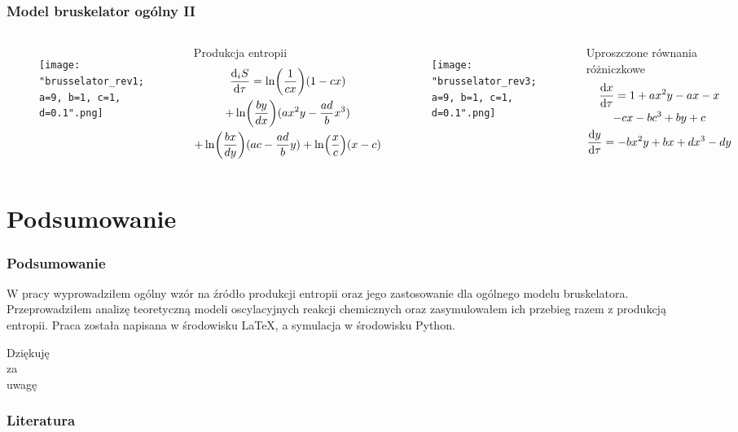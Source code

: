 \documentclass{beamer}
\begin{document}
\begin{frame}
\frametitle{Model bruskelator ogólny II}
\begin{columns}
\begin{figure}
\texttt{[image: "brusselator\_rev1; a=9, b=1, c=1, d=0.1".png]}
\end{figure}
\begin{block}{Produkcja entropii}
\vspace*{-\baselineskip}\setlength\belowdisplayshortskip{0pt}
\footnotesize
\begin{gather*}
	\dv{_{i}S}{\tau} = \ln(\frac{1}{cx})(1 - cx) \\
	+ \ln(\frac{by}{dx})(ax^{2}y - \frac{ad}{b}x^{3}) \\
	+ \ln(\frac{bx}{dy})(ac - \frac{ad}{b}y) + \ln(\frac{x}{c})(x - c)
\end{gather*}
\normalsize
\end{block}
\begin{figure}
\texttt{[image: "brusselator\_rev3; a=9, b=1, c=1, d=0.1".png]}
\end{figure}
\begin{block}{Uproszczone równania różniczkowe}
\vspace*{-\baselineskip}\setlength\belowdisplayshortskip{0pt}
\small
\begin{gather*}
	\dv{x}{\tau} = 1 + ax^{2}y - ax - x \\
	- cx - bc^{3} + by + c \\
	\dv{y}{\tau} = -bx^{2}y + bx + dx^{3} - dy
\end{gather*}
\normalsize
\end{block}
\end{columns}
\end{frame}

\section{Podsumowanie}

\begin{frame}
\frametitle{Podsumowanie}
W pracy wyprowadziłem ogólny wzór na źródło produkcji entropii oraz jego zastosowanie dla ogólnego modelu bruskelatora. Przeprowadziłem analizę teoretyczną modeli oscylacyjnych reakcji chemicznych oraz zasymulowałem ich przebieg razem z produkcją entropii. Praca została napisana w środowisku \LaTeX, a symulacja w środowisku Python.
\end{frame}

\begin{frame}
\begin{center}
\Large
Dziękuję \\
za \\
uwagę
\end{center}
\end{frame}



\begin{frame}
\frametitle{Literatura}
\nocite{orlik, pigon1, kawczynski, palczewski, fortuna, orlik_sily_w_przyrodzie}
\tiny
\printbibliography
\end{frame}
\end{document}
